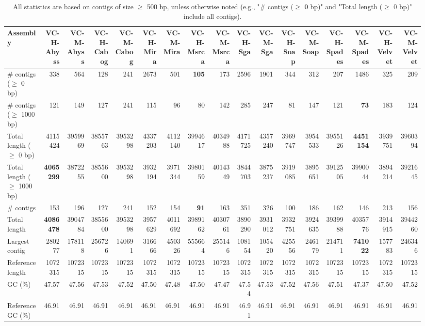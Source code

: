 \documentclass[12pt,a4paper]{article}
\begin{document}
\begin{table}[ht]
\begin{center}
\caption{All statistics are based on contigs of size $\geq$ 500 bp, unless otherwise noted (e.g., "\# contigs ($\geq$ 0 bp)" and "Total length ($\geq$ 0 bp)" include all contigs).}
\begin{tabular}{|l*{16}{|r}|}
\hline
Assembly & VC-H-Abyss & VC-M-Abyss & VC-H-Cabog & VC-M-Cabog & VC-H-Mira & VC-M-Mira & VC-H-Msrca & VC-M-Msrca & VC-H-Sga & VC-M-Sga & VC-H-Soap & VC-M-Soap & VC-H-Spades & VC-M-Spades & VC-H-Velvet & VC-M-Velvet \\ \hline
\# contigs ($\geq$ 0 bp) & 338 & 564 & 128 & 241 & 2673 & 501 & {\bf 105} & 173 & 2596 & 1901 & 344 & 312 & 207 & 1486 & 325 & 209 \\ \hline
\# contigs ($\geq$ 1000 bp) & 121 & 149 & 127 & 241 & 115 & 96 & 80 & 142 & 285 & 247 & 81 & 147 & 121 & {\bf 73} & 183 & 124 \\ \hline
Total length ($\geq$ 0 bp) & 4115424 & 3959969 & 3855763 & 3953298 & 4337203 & 4112140 & 3994617 & 4034988 & 4171725 & 4357240 & 3969747 & 3954533 & 3955126 & {\bf 4451154} & 3939751 & 3960394 \\ \hline
Total length ($\geq$ 1000 bp) & {\bf 4065299} & 3872255 & 3855600 & 3953298 & 3932194 & 3971344 & 3980159 & 4014349 & 3844703 & 3875237 & 3919085 & 3895651 & 3912505 & 3990044 & 3894214 & 3921645 \\ \hline
\# contigs & 153 & 196 & 127 & 241 & 152 & 154 & {\bf 91} & 163 & 351 & 326 & 100 & 186 & 162 & 146 & 213 & 156 \\ \hline
Total length & {\bf 4086478} & 3904784 & 3855600 & 3953298 & 3957629 & 4011692 & 3989162 & 4030761 & 3890290 & 3931012 & 3932751 & 3924635 & 3939988 & 4035776 & 3914915 & 3944260 \\ \hline
Largest contig & 280277 & 178118 & 256726 & 140691 & 316666 & 450326 & 555664 & 255146 & 108154 & 105420 & 425556 & 246179 & 214711 & {\bf 741022} & 157783 & 246346 \\ \hline
Reference length & 1072315 & 1072315 & 1072315 & 1072315 & 1072315 & 1072315 & 1072315 & 1072315 & 1072315 & 1072315 & 1072315 & 1072315 & 1072315 & 1072315 & 1072315 & 1072315 \\ \hline
GC (\%) & 47.57 & 47.56 & 47.53 & 47.52 & 47.50 & 47.48 & 47.50 & 47.47 & 47.54 & 47.53 & 47.52 & 47.56 & 47.51 & 47.37 & 47.50 & 47.52 \\ \hline
Reference GC (\%) & 46.91 & 46.91 & 46.91 & 46.91 & 46.91 & 46.91 & 46.91 & 46.91 & 46.91 & 46.91 & 46.91 & 46.91 & 46.91 & 46.91 & 46.91 & 46.91 \\ \hline

\end{tabular}
\end{center}
\end{table}
\end{document}
